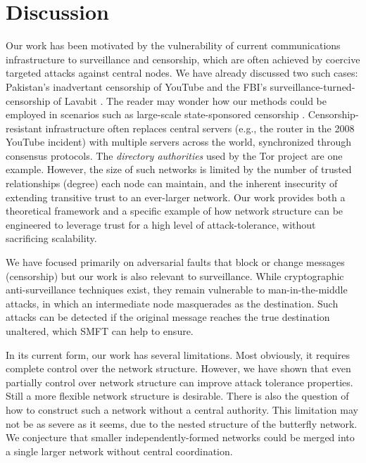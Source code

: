 \documentclass[10pt,letterpaper]{article}
\begin{document}
\section*{Discussion}
\label{sec-discussion}

Our work has been motivated by the vulnerability of current communications
infrastructure to surveillance and censorship,
which are often achieved by coercive targeted attacks against central nodes.
We have already discussed two such cases:
Pakistan's inadvertant censorship of YouTube
\cite{hunter_pakistan_2008}
and the FBI's surveillance-turned-censorship of Lavabit
\cite{poulsen_edward_2013}.
The reader may wonder how our methods could be employed in scenarios
such as large-scale state-sponsored censorship
\cite{xu_internet_2011}.
Censorship-resistant infrastructure often replaces central servers
(e.g., the router in the 2008 YouTube incident) with multiple servers across
the world, synchronized through consensus protocols.
The {\em directory authorities} used by the Tor project
\cite{dingledine_tor:_2004} are one example.
However, the size of such networks is limited by the number of
trusted relationships (degree) each node can maintain, and the inherent insecurity of
extending transitive trust to an ever-larger network.
Our work provides both a theoretical framework
and a specific example of how network structure
can be engineered to leverage trust for a high level of attack-tolerance,
without sacrificing scalability.

We have focused primarily on adversarial faults that block or
change messages (censorship) but our work is also relevant to
surveillance.
While cryptographic anti-surveillance techniques exist,
they remain vulnerable to man-in-the-middle attacks,
in which an intermediate node masquerades as the destination.
Such attacks can be detected if the original message reaches the true
destination unaltered,
which SMFT can help to ensure.

In its current form, our work has several limitations.
Most obviously, it requires complete control over the network structure.
However, we have shown that even partially control over network structure can
improve attack tolerance properties.
Still a more flexible network structure is desirable.
There is also the question of how to construct such a network without a central
authority.
This limitation may not be as severe as it seems,
due to the nested structure of the butterfly network.
We conjecture that smaller independently-formed networks could be
merged into a single larger network without central coordination.
\end{document}
